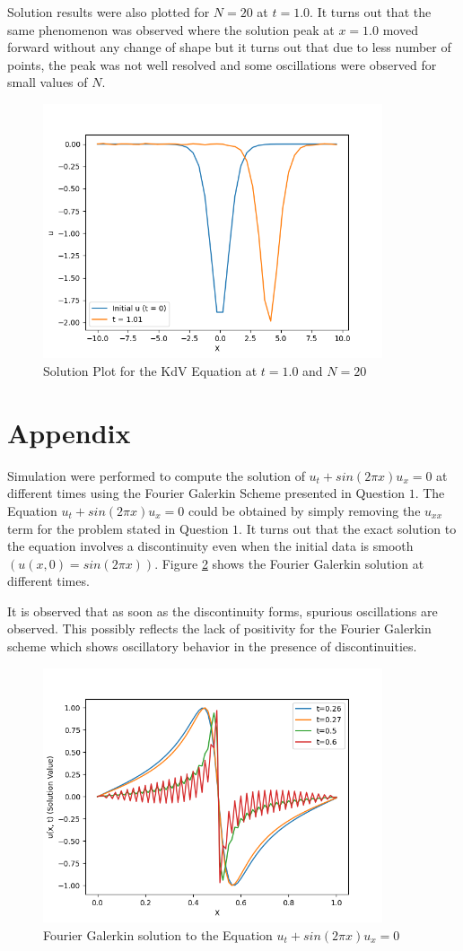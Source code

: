 \documentclass[12pt]{article}
\begin{document}
Solution results were also plotted for $N = 20$ at $t = 1.0$. It turns out that the same phenomenon was observed where the solution peak at $x = 1.0$ moved forward without any change of shape but it turns out that due to less number of points, the peak was not well resolved and some oscillations were observed for small values of $N$.
\begin{figure}
    \centering
    \includegraphics[width = 10cm]{solutionPlot_N=20t = 1.01.png}
    \caption{Solution Plot for the KdV Equation at $t = 1.0$ and $N = 20$}
    \label{fig:Q2_N=64,t=1}
\end{figure}

\section{Appendix}
Simulation were performed to compute the solution of $u_t + sin(2 \pi x)u_x = 0$ at different times using the Fourier Galerkin Scheme presented in Question $1$. The Equation $u_t + sin(2 \pi x)u_x = 0$ could be obtained by simply removing the $u_{xx}$ term for the problem stated in Question $1$. It turns out that the exact solution to the equation involves a discontinuity even when the initial data is smooth $(u(x, 0) = sin(2 \pi x))$. Figure \ref{fig:app:uxplot} shows the Fourier Galerkin solution at different times.

It is observed that as soon as the discontinuity forms, spurious oscillations are observed. This possibly reflects the lack of positivity for the Fourier Galerkin scheme which shows oscillatory behavior in the presence of discontinuities.
\begin{figure}
    \centering
    \includegraphics[width=10cm]{uxplot_Q1.png}
    \caption{Fourier Galerkin solution to the Equation $u_t + sin(2 \pi x)u_x = 0$}
    \label{fig:app:uxplot}
\end{figure}
\end{document}
